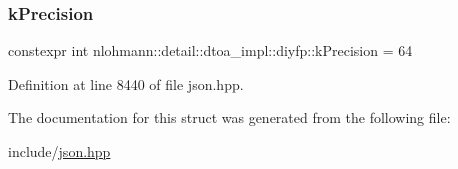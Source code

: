 \subsubsection{\texorpdfstring{k\+Precision}{kPrecision}}
{\footnotesize\ttfamily constexpr int nlohmann\+::detail\+::dtoa\+\_\+impl\+::diyfp\+::k\+Precision = 64\hspace{0.3cm}{\ttfamily [static]}}



Definition at line 8440 of file json.\+hpp.



The documentation for this struct was generated from the following file\+:\begin{DoxyCompactItemize}
\item 
include/\hyperlink{json_8hpp}{json.\+hpp}\end{DoxyCompactItemize}
